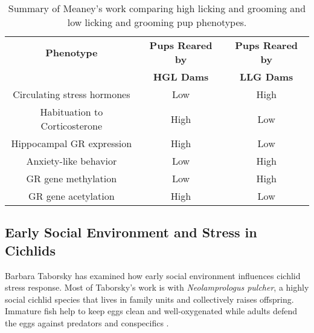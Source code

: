 \documentclass[12pt,twoside]{reedthesis}
\begin{document}
\begin{table}[htbp]
\caption[Summary of Meaney's work comparing high licking and grooming and low licking and grooming
pup phenotypes]{Summary of Meaney's work comparing high licking and grooming and low licking and grooming
pup phenotypes.}
\begin{center}
\footnotesize
\begin{tabular}{ | c | c | c | }
  \hline
  \textbf{Phenotype} & \textbf{Pups Reared by} & \textbf{Pups Reared by} \\
  & \textbf{HGL Dams} & \textbf{LLG Dams} \\
\hline
 Circulating stress hormones & Low & High\\
\hline
 Habituation to Corticosterone  & High & Low\\
\hline
  Hippocampal GR expression & High & Low\\
\hline
  Anxiety-like behavior & Low & High\\
\hline
  GR gene methylation & Low & High \\
\hline
  GR gene acetylation & High & Low \\
  \hline
\end{tabular}
\end{center}
\end{table}

\subsection{Early Social Environment and Stress in Cichlids}

Barbara Taborsky has examined how early social environment influences cichlid
stress response.
Most of Taborsky's work is with \textit{Neolamprologus pulcher}, a highly social cichlid species
that lives in family units and collectively raises offspring. Immature fish help
to keep eggs clean and well-oxygenated while adults defend the eggs against
predators and conspecifics \citep{arnold_social_2010}.
\end{document}
